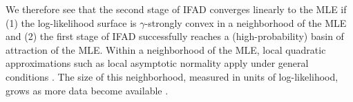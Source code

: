 \documentclass[9pt,twocolumn,pnasresearcharticle]{pnas-new}
\begin{document}
We therefore see that the second stage of IFAD converges linearly to the MLE if (1) the log-likelihood surface is $\gamma$-strongly convex in a neighborhood of the MLE and (2) the first stage of IFAD successfully reaches a (high-probability) basin of attraction of the MLE. 
Within a neighborhood of the MLE, local quadratic approximations such as local asymptotic normality apply under general conditions \cite{lecam00}.
The size of this neighborhood, measured in units of log-likelihood, grows as more data become available \cite{ning21}.




\end{document}
